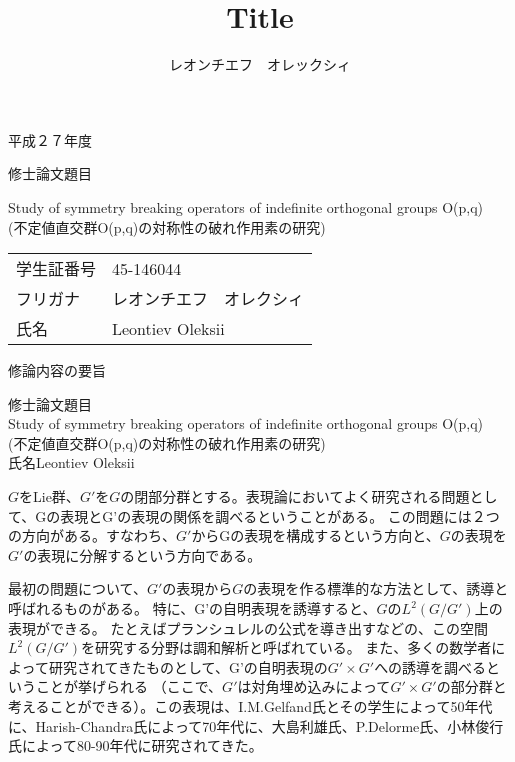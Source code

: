 \documentclass[a4paper]{article} %
\title{Title}
\author{レオンチエフ　オレックシィ}
\begin{document}
\begin{titlepage}
{\huge\begin{spacing}{1.2}
\begin{center}
	平成２７年度
	\end{center}
	\vspace{2cm}
	修士論文題目
	\begin{center}
	{\Huge Study of symmetry breaking operators of indefinite orthogonal groups O(p,q)}\\
	(不定値直交群O(p,q)の対称性の破れ作用素の研究)\\
\vspace{6cm}
\begin{tabular}{ll}
学生証番号&45-146044\\
フリガナ & レオンチエフ　オレクシィ\\
氏名&Leontiev Oleksii
\end{tabular}
	\end{center}
\end{spacing}
}
\end{titlepage}
\begin{spacing}{1.5}
\begin{center} 修論内容の要旨\end{center}
\noindent 修士論文題目\\ 
Study of symmetry breaking operators of indefinite orthogonal groups O(p,q)\\
(不定値直交群O(p,q)の対称性の破れ作用素の研究)\\
氏名\quad Leontiev Oleksii
\end{spacing}\vspace{0.5cm}

$G$をLie群、$G'$を$G$の閉部分群とする。表現論においてよく研究される問題として、Gの表現とG’の表現の関係を調べるということがある。
この問題には２つの方向がある。すなわち、$G'$からGの表現を構成するという方向と、$G$の表現を$G'$の表現に分解するという方向である。\par
最初の問題について、$G'$の表現から$G$の表現を作る標準的な方法として、誘導と呼ばれるものがある。
特に、G’の自明表現を誘導すると、$G$の$L^2(G/G')$上の表現ができる。
たとえばプランシュレルの公式を導き出すなどの、この空間$L^2(G/G')$を研究する分野は調和解析と呼ばれている。
また、多くの数学者によって研究されてきたものとして、G’の自明表現の$G'\times G'$への誘導を調べるということが挙げられる
（ここで、$G'$は対角埋め込みによって$G'\times G'$の部分群と考えることができる）。この表現は、I.M.Gelfand氏とその学生によって50年代に、Harish-Chandra氏によって70年代に、大島利雄氏、P.Delorme氏、小林俊行氏によって80-90年代に研究されてきた。
\end{document}
